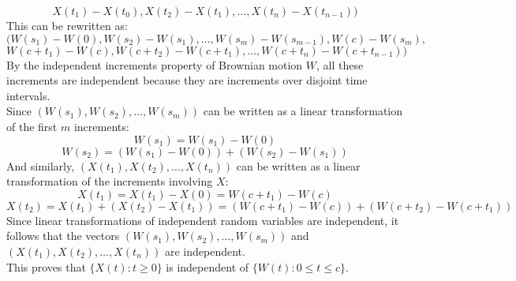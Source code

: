 \documentclass{article}
\begin{document}
{$$X(t_1) - X(t_0), X(t_2) - X(t_1), \ldots, X(t_n) - X(t_{n-1}))$$
This can be rewritten as:
$$(W(s_1) - W(0), W(s_2) - W(s_1), \ldots, W(s_m) - W(s_{m-1}), W(c) - W(s_m), $$
$$W(c + t_1) - W(c), W(c + t_2) - W(c + t_1), \ldots, W(c + t_n) - W(c + t_{n-1}))$$
By the independent increments property of Brownian motion $W$, all these increments are independent because they are increments over disjoint time intervals. \\
Since $(W(s_1), W(s_2), \ldots, W(s_m))$ can be written as a linear transformation of the first $m$ increments:
$$W(s_1) = W(s_1) - W(0)$$
$$W(s_2) = (W(s_1) - W(0)) + (W(s_2) - W(s_1)) $$
And similarly, $(X(t_1), X(t_2), \ldots, X(t_n))$ can be written as a linear transformation of the increments involving $X$:
$$X(t_1) = X(t_1) - X(0) = W(c + t_1) - W(c) $$
$$X(t_2) = X(t_1) + (X(t_2) - X(t_1)) = (W(c + t_1) - W(c)) + (W(c + t_2) - W(c + t_1)) $$
Since linear transformations of independent random variables are independent, it follows that the vectors $(W(s_1), W(s_2), \ldots, W(s_m))$ and $(X(t_1), X(t_2), \ldots, X(t_n))$ are independent. \\
This proves that $\{X(t) : t \geq 0\}$ is independent of $\{W(t) : 0 \leq t \leq c\}$.
}
\end{document}
